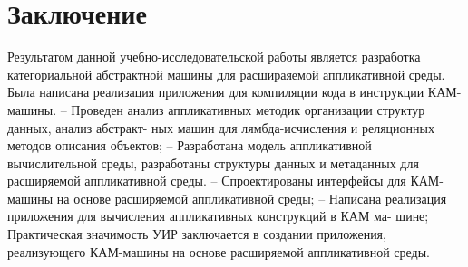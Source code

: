 \chapter*{Заключение}

Результатом данной учебно-исследовательской работы является разработка категориальной абстрактной машины для расшираяемой аппликативной среды.
Была написана реализация приложения для компиляции кода в инструкции КАМ-машины.
-- Проведен анализ аппликативных методик организации структур данных, анализ абстракт-
ных машин для лямбда-исчисления и реляционных методов описания объектов;
-- Разработана модель аппликативной вычислительной среды, разработаны структуры данных
и метаданных для расширяемой аппликативной среды.
-- Спроектированы интерфейсы для КАМ-машины на основе расширяемой аппликативной среды;
-- Написана реализация приложения для вычисления аппликативных конструкций в КАМ ма-
шине;
Практическая значимость УИР заключается в создании приложения, реализующего КАМ-машины на основе расширяемой аппликативной среды.